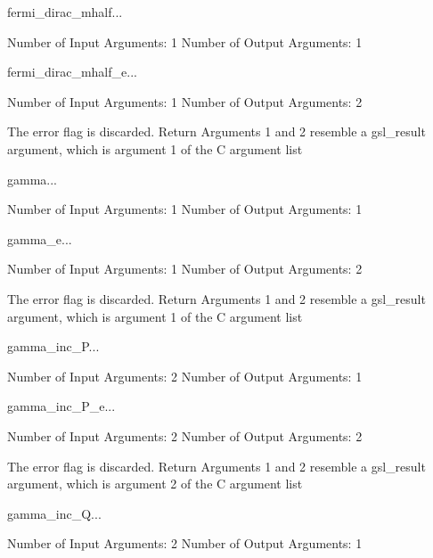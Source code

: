 \begin{funcdesc}{fermi_dirac_mhalf}{...}

    Number of Input  Arguments:  1
    Number of Output Arguments:  1
\end{funcdesc}

\begin{funcdesc}{fermi_dirac_mhalf_e}{...}

    Number of Input  Arguments:  1
    Number of Output Arguments:  2

The error flag is discarded.
Return Arguments 1 and 2 resemble a gsl_result argument,
	which is  argument 1 of the C argument list

\end{funcdesc}

\begin{funcdesc}{gamma}{...}

    Number of Input  Arguments:  1
    Number of Output Arguments:  1
\end{funcdesc}

\begin{funcdesc}{gamma_e}{...}

    Number of Input  Arguments:  1
    Number of Output Arguments:  2

The error flag is discarded.
Return Arguments 1 and 2 resemble a gsl_result argument,
	which is  argument 1 of the C argument list

\end{funcdesc}

\begin{funcdesc}{gamma_inc_P}{...}

    Number of Input  Arguments:  2
    Number of Output Arguments:  1
\end{funcdesc}

\begin{funcdesc}{gamma_inc_P_e}{...}

    Number of Input  Arguments:  2
    Number of Output Arguments:  2

The error flag is discarded.
Return Arguments 1 and 2 resemble a gsl_result argument,
	which is  argument 2 of the C argument list

\end{funcdesc}

\begin{funcdesc}{gamma_inc_Q}{...}

    Number of Input  Arguments:  2
    Number of Output Arguments:  1
\end{funcdesc}

